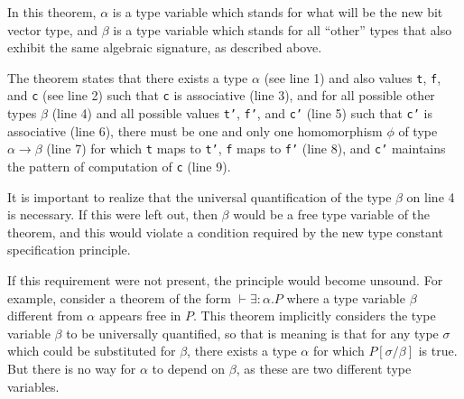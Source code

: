 In this theorem, $\alpha$ is a type variable which stands for what will be the
new bit vector type, and $\beta$ is a type variable which stands for
all ``other'' types that also exhibit the same algebraic signature, as described above.

The theorem states that there exists a type $\alpha$ (see line 1) and also 
values \texttt{t}, \texttt{f}, and \texttt{c} (see line 2) such that
\texttt{c} is associative (line 3),
and for all possible other types $\beta$ (line 4)
and all possible values \texttt{t'}, \texttt{f'}, and \texttt{c'} (line 5)
such that \texttt{c'} is associative (line 6),
there must be one and only one homomorphism $\phi$
of type $\alpha \rightarrow \beta$ (line 7)
for which \texttt{t} maps to \texttt{t'},
\texttt{f} maps to \texttt{f'} (line 8),
and \texttt{c'} maintains the pattern of computation of \texttt{c} (line 9).

It is important to realize that the universal quantification of the type $\beta$
on line 4 is necessary. If this were left out, then $\beta$ would be a free type
variable of the theorem,
and this
would violate a condition required
by the
new type constant specification
principle.

If this requirement were not present, the principle would become unsound.
%
For example, consider a theorem of the form $\vdash \exists{:}\alpha.P$
where a type variable $\beta$ different from $\alpha$ appears free in $P$.
This theorem implicitly considers the type variable $\beta$ to be universally
quantified, so that is meaning is that for any type $\sigma$ which could be
substituted for $\beta$, there exists a type $\alpha$ for which 
$P[\sigma / \beta]$ is true. But there is no way for $\alpha$ to depend on
$\beta$, as these are two different type variables.


